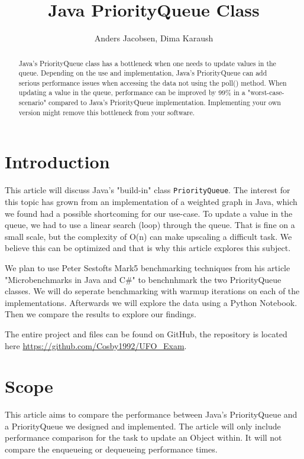 \documentclass{article}
\title{Java PriorityQueue Class}
\author{Anders Jacobsen, Dima Karaush}
\begin{document}
\maketitle

\begin{abstract}
    Java's PriorityQueue class has a bottleneck when one needs to update values in the queue.
    Depending on the use and implementation, Java's PriorityQueue can add serious performance 
    issues when accessing the data not using the poll() method.
    When updating a value in the queue, performance can be improved by 99\% in a "worst-case-scenario" compared 
    to Java's PriorityQueue implementation. Implementing your own version might remove this 
    bottleneck from your software. 
\end{abstract}

\section{Introduction}
This article will discuss Java's "build-in" class \lstinline!PriorityQueue!. 
The interest for this topic has grown from an implementation of a weighted graph 
in Java, which we found had a possible shortcoming for our use-case. To update
a value in the queue, we had to use a linear search (loop) through the queue. 
That is fine on a small scale, but the complexity of O(n) can make upscaling a difficult task. 
We believe this can be optimized and that is why this article explores this subject.  

We plan to use Peter Sestofts Mark5 benchmarking techniques from his article 
"Microbenchmarks in Java and C\#" \cite{microbenchmarks} to benchnhmark the two 
PriorityQueue classes. We will do seperate benchmarking with warmup iterations on 
each of the implementations. Afterwards we will explore the data using a Python
Notebook. Then we compare the results to explore our findings. 

The entire project and files can be found on GitHub, the repository is located here 
\url{https://github.com/Cosby1992/UFO_Exam}.


\section{Scope}
This article aims to compare the performance between Java's PriorityQueue
and a PriorityQueue we designed and implemented. The article will only include 
performance comparison for the task to update an Object within. It will not 
compare the enqueueing or dequeueing performance times.
\end{document}
